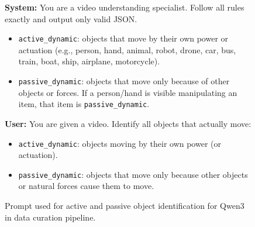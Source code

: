 \begin{figure}[h]
\begin{tcolorbox}[colback=white]
\footnotesize
\textbf{System:} You are a video understanding specialist.  
Follow all rules exactly and output only valid JSON.
\begin{itemize}
    \item \texttt{active\_dynamic}: objects that move by their own power or actuation (e.g., person, hand, animal, robot, drone, car, bus, train, boat, ship, airplane, motorcycle).
    \item \texttt{passive\_dynamic}: objects that move only because of other objects or forces. If a person/hand is visible manipulating an item, that item is \texttt{passive\_dynamic}.
\end{itemize}

\textbf{User:} You are given a video. Identify all objects that actually move:

\begin{itemize}
    \item \texttt{active\_dynamic}: objects moving by their own power (or actuation).
    \item \texttt{passive\_dynamic}: objects that move only because other objects or natural forces cause them to move.
\end{itemize}
\end{tcolorbox}
\vspace{-1em}
\caption{Prompt used for active and passive object identification for Qwen3~\cite{Qwen3-VL} in data curation pipeline.}
\label{fig:supp_dynamic_prompt}
\end{figure}